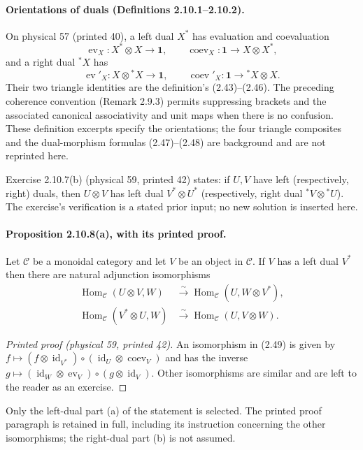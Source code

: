 \documentclass[11pt]{article}
\DeclareMathOperator{\Hom}{Hom}
\newcommand{\Cat}{\mathcal C}
\newcommand{\unit}{\mathbf 1}
\begin{document}
\paragraph{Orientations of duals (Definitions 2.10.1--2.10.2).}
On physical 57 (printed 40), a left dual $X^*$ has evaluation and
coevaluation
\[
\operatorname{ev}_X:X^*\otimes X\longrightarrow\unit,
\qquad
\operatorname{coev}_X:\unit\longrightarrow X\otimes X^*,
\]
and a right dual ${}^*X$ has
\[
\operatorname{ev}'_X:X\otimes{}^*X\longrightarrow\unit,
\qquad
\operatorname{coev}'_X:\unit\longrightarrow{}^*X\otimes X.
\]
Their two triangle identities are the definition's (2.43)--(2.46).
The preceding coherence convention (Remark 2.9.3) permits suppressing
brackets and the associated canonical associativity and unit maps when
there is no confusion. These definition excerpts specify the orientations;
the four triangle composites and the dual-morphism formulas (2.47)--(2.48)
are background and are not reprinted here.

Exercise 2.10.7(b) (physical 59, printed 42) states: if $U,V$ have left
(respectively, right) duals, then $U\otimes V$ has left dual
$V^*\otimes U^*$ (respectively, right dual ${}^*V\otimes{}^*U$).
The exercise's verification is a stated prior input; no new solution is
inserted here.

\paragraph{Proposition 2.10.8(a), with its printed proof.}
Let $\Cat$ be a monoidal category and let $V$ be an object in $\Cat$.
If $V$ has a left dual $V^*$ then there are natural adjunction
isomorphisms
\begin{align}
\Hom_{\Cat}(U\otimes V,W)&\xrightarrow{\sim}
\Hom_{\Cat}(U,W\otimes V^*),\tag{2.49}\\
\Hom_{\Cat}(V^*\otimes U,W)&\xrightarrow{\sim}
\Hom_{\Cat}(U,V\otimes W).\tag{2.50}
\end{align}
\begin{proof}[Printed proof (physical 59, printed 42)]
An isomorphism in (2.49) is given by
$f\mapsto(f\otimes\operatorname{id}_{V^*})\circ
(\operatorname{id}_U\otimes\operatorname{coev}_V)$ and has the inverse
$g\mapsto(\operatorname{id}_W\otimes\operatorname{ev}_V)\circ
(g\otimes\operatorname{id}_V)$. Other isomorphisms are similar and
are left to the reader as an exercise.
\end{proof}
Only the left-dual part (a) of the statement is selected. The printed
proof paragraph is retained in full, including its instruction concerning
the other isomorphisms; the right-dual part (b) is not assumed.
\end{document}
